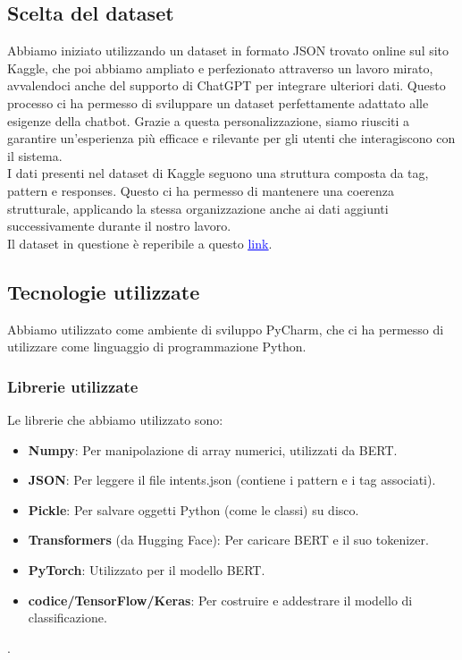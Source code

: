 \documentclass[12pt, letterpaper]{article}
\begin{document}
\subsection{Scelta del dataset}
Abbiamo iniziato utilizzando un dataset in formato JSON trovato online sul sito Kaggle, che poi abbiamo ampliato e perfezionato attraverso un lavoro mirato, avvalendoci anche del supporto di ChatGPT per integrare ulteriori dati. Questo processo ci ha permesso di sviluppare un dataset perfettamente adattato alle esigenze della chatbot. Grazie a questa personalizzazione, siamo riusciti a garantire un’esperienza più efficace e rilevante per gli utenti che interagiscono con il sistema.\\
I dati presenti nel dataset di Kaggle seguono una struttura composta da tag, pattern e responses. Questo ci ha permesso di mantenere una coerenza strutturale, applicando la stessa organizzazione anche ai dati aggiunti successivamente durante il nostro lavoro.\\
Il dataset in questione è reperibile a questo \href{https://www.kaggle.com/code/jocelyndumlao/chatbot-for-mental-health-conversations}{\textcolor{blue}{\underline{link}}}.

\subsection{Tecnologie utilizzate}
Abbiamo utilizzato come ambiente di sviluppo PyCharm, che ci ha permesso di utilizzare come linguaggio di programmazione Python. 

\subsubsection{Librerie utilizzate}
Le librerie che abbiamo utilizzato sono:
\begin{itemize}
	\item \textbf{Numpy}: Per manipolazione di array numerici, utilizzati da BERT.
	
	\item \textbf{JSON}: Per leggere il file intents.json (contiene i pattern e i tag associati).
	
	\item \textbf{Pickle}: Per salvare oggetti Python (come le classi) su disco.
	
	\item \textbf{Transformers} (da Hugging Face): Per caricare BERT e il suo tokenizer.
	
	\item \textbf{PyTorch}: Utilizzato per il modello BERT.
	
	\item \textbf{codice/TensorFlow/Keras}: Per costruire e addestrare il modello di classificazione.
	
\end{itemize}.
\end{document}
